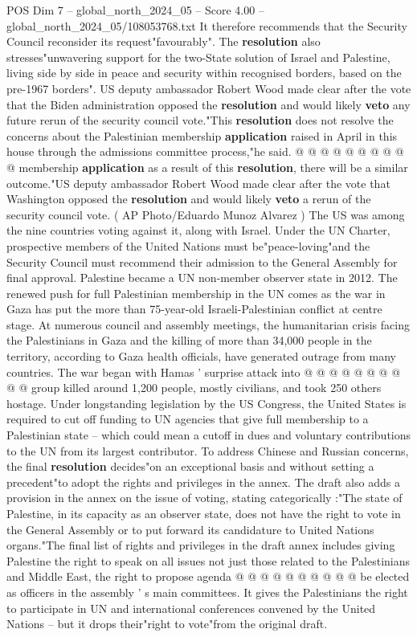 \begin{textsample}{POS Dim 7 – global\_north\_2024\_05 – Score 4.00 – global\_north\_2024\_05/108053768.txt}
It therefore recommends that the Security Council reconsider its request"favourably".
The \textbf{resolution} also stresses"unwavering support for the two-State solution of Israel and Palestine, living side by side in peace and security within recognised borders, based on the pre-1967 borders".
US deputy ambassador Robert Wood made clear after the vote that the Biden administration opposed the \textbf{resolution} and would likely \textbf{veto} any future rerun of the security council vote."This \textbf{resolution} does not resolve the concerns about the Palestinian membership \textbf{application} raised in April in this house through the admissions committee process,"he said. @ @ @ @ @ @ @ @ @ @ membership \textbf{application} as a result of this \textbf{resolution}, there will be a similar outcome."US deputy ambassador Robert Wood made clear after the vote that Washington opposed the \textbf{resolution} and would likely \textbf{veto} a rerun of the security council vote. ( AP Photo/Eduardo Munoz Alvarez ) The US was among the nine countries voting against it, along with Israel.
Under the UN Charter, prospective members of the United Nations must be"peace-loving"and the Security Council must recommend their admission to the General Assembly for final approval.
Palestine became a UN non-member observer state in 2012.
The renewed push for full Palestinian membership in the UN comes as the war in Gaza has put the more than 75-year-old Israeli-Palestinian conflict at centre stage.
At numerous council and assembly meetings, the humanitarian crisis facing the Palestinians in Gaza and the killing of more than 34,000 people in the territory, according to Gaza health officials, have generated outrage from many countries.
The war began with Hamas ' surprise attack into @ @ @ @ @ @ @ @ @ @ group killed around 1,200 people, mostly civilians, and took 250 others hostage.
Under longstanding legislation by the US Congress, the United States is required to cut off funding to UN agencies that give full membership to a Palestinian state -- which could mean a cutoff in dues and voluntary contributions to the UN from its largest contributor.
To address Chinese and Russian concerns, the final \textbf{resolution} decides"on an exceptional basis and without setting a precedent"to adopt the rights and privileges in the annex.
The draft also adds a provision in the annex on the issue of voting, stating categorically :"The state of Palestine, in its capacity as an observer state, does not have the right to vote in the General Assembly or to put forward its candidature to United Nations organs."The final list of rights and privileges in the draft annex includes giving Palestine the right to speak on all issues not just those related to the Palestinians and Middle East, the right to propose agenda @ @ @ @ @ @ @ @ @ @ be elected as officers in the assembly ' s main committees.
It gives the Palestinians the right to participate in UN and international conferences convened by the United Nations -- but it drops their"right to vote"from the original draft.

\end{textsample}
